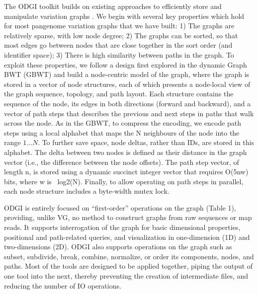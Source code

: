 \documentclass{bioinfo}
\begin{document}
The ODGI toolkit builds on existing approaches to efficiently store and manipulate variation graphs \citep{Eizenga_2020_BX}. %
We begin with several key properties which hold for most pangenome variation graphs that we have built: 1) The graphs are relatively sparse, with low node degree; 2) The graphs can be sorted, so that most edges go between nodes that are close together in the sort order (and identifier space); 3) There is high similarity between paths in the graph.
To exploit these properties, we follow a design first explored in the dynamic Graph BWT (GBWT) \citep{Siren:2020} and build a node-centric model of the graph, where the graph is stored in a vector of node structures, each of which presents a node-local view of the graph sequence, topology, and path layout.
Each structure contains the sequence of the node, its edges in both directions (forward and backward), and a vector of path steps that describes the previous and next steps in paths that walk across the node.
As in the GBWT, to compress the encoding, we encode path steps using a local alphabet that maps the N neighbours of the node into the range $1\ldots N$.
To further save space, node deltas, rather than IDs, are stored in this alphabet.
The delta between two nodes is defined as their distance in the graph vector (i.e., the difference between the node offsets).
The path step vector, of length n, is stored using a dynamic succinct integer vector that requires O(5nw) bits, where w is ~log2(N).
Finally, to allow operating on path steps in parallel, each node structure includes a byte-width mutex lock.


ODGI is entirely focused on “first-order” operations on the graph (Table 1), providing, unlike VG, no method to construct graphs from raw sequences or map reads.
It supports interrogation of the graph for basic dimensional properties, positional and path-related queries, and visualization in one-dimension (1D) and two-dimensions (2D).
ODGI also supports operations on the graph such as subset, subdivide, break, combine, normalize, or order its components, nodes, and paths.
Most of the tools are designed to be applied together, piping the output of one tool into the next, thereby preventing the creation of intermediate files, and reducing the number of IO operations.
\end{document}
